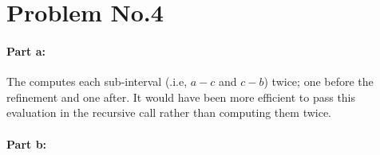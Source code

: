 \section*{Problem No.4} 
\paragraph{Part a:} The computes each sub-interval (.i.e, $a-c$ and $c-b$) twice; one before the refinement and one after. It would have been more efficient to pass this evaluation in the recursive call rather than computing them twice. 

\paragraph{Part b:}

